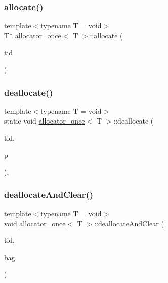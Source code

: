 \subsubsection{\texorpdfstring{allocate()}{allocate()}}
{\footnotesize\ttfamily template$<$typename T  = void$>$ \\
T$\ast$ \hyperlink{classallocator__once}{allocator\+\_\+once}$<$ T $>$\+::allocate (\begin{DoxyParamCaption}\item[{const int}]{tid }\end{DoxyParamCaption})\hspace{0.3cm}{\ttfamily [inline]}}

\mbox{\label{classallocator__once_a7fbe0cd20adb62e1c160cecc98bcc257}} 
\subsubsection{\texorpdfstring{deallocate()}{deallocate()}}
{\footnotesize\ttfamily template$<$typename T  = void$>$ \\
static void \hyperlink{classallocator__once}{allocator\+\_\+once}$<$ T $>$\+::deallocate (\begin{DoxyParamCaption}\item[{const int}]{tid,  }\item[{T $\ast$const}]{p }\end{DoxyParamCaption})\hspace{0.3cm}{\ttfamily [inline]}, {\ttfamily [static]}}

\mbox{\label{classallocator__once_a311dcf7b1c2d5792b1bc8ce418ab9b42}} 
\subsubsection{\texorpdfstring{deallocate\+And\+Clear()}{deallocateAndClear()}}
{\footnotesize\ttfamily template$<$typename T  = void$>$ \\
void \hyperlink{classallocator__once}{allocator\+\_\+once}$<$ T $>$\+::deallocate\+And\+Clear (\begin{DoxyParamCaption}\item[{const int}]{tid,  }\item[{\hyperlink{classblockbag}{blockbag}$<$ T $>$ $\ast$const}]{bag }\end{DoxyParamCaption})\hspace{0.3cm}{\ttfamily [inline]}}

